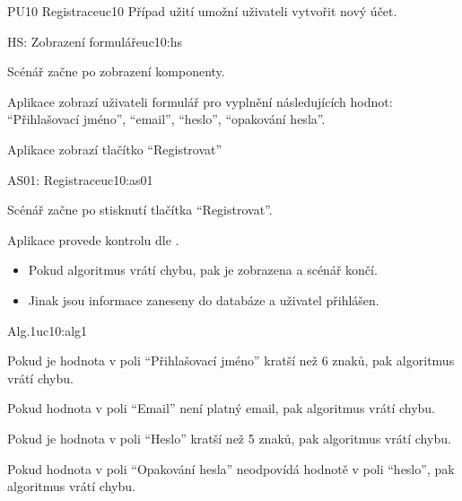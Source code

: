 \begin{usecase}{PU10 Registrace}{uc10}
    Případ užití umožní uživateli vytvořit nový účet.

    \begin{scenario}{HS: Zobrazení formuláře}{uc10:hs}
        \item Scénář začne po zobrazení komponenty.
        \item Aplikace zobrazí uživateli formulář pro vyplnění následujících hodnot: \enquote{Přihlašovací jméno}, \enquote{email}, \enquote{heslo}, \enquote{opakování hesla}.
        \item Aplikace zobrazí tlačítko \enquote{Registrovat}
    \end{scenario}

    \begin{scenario}{AS01: Registrace}{uc10:as01}
        \item Scénář začne po stisknutí tlačítka \enquote{Registrovat}.
        \item Aplikace provede kontrolu dle .
        \begin{itemize}
            \item Pokud algoritmus vrátí chybu, pak je zobrazena a scénář končí.
            \item Jinak jsou informace zaneseny do databáze a uživatel přihlášen.
        \end{itemize}
    \end{scenario}

    \begin{scenario}{Alg.1}{uc10:alg1}
        \item Pokud je hodnota v poli \enquote{Přihlašovací jméno} kratší než 6 znaků, pak algoritmus vrátí chybu.
        \item Pokud hodnota v poli \enquote{Email} není platný email, pak algoritmus vrátí chybu.
        \item Pokud je hodnota v poli \enquote{Heslo} kratší než 5 znaků, pak algoritmus vrátí chybu.
        \item Pokud hodnota v poli \enquote{Opakování hesla} neodpovídá hodnotě v poli \enquote{heslo}, pak algoritmus vrátí chybu.
    \end{scenario}
\end{usecase}